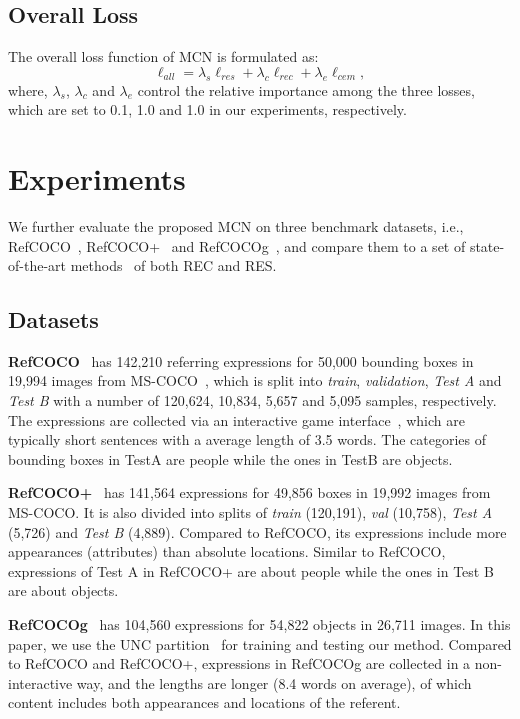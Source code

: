 \documentclass[10pt,twocolumn,letterpaper]{article}
\begin{document}
	
\subsection{Overall Loss}

The overall loss function of MCN is  formulated as:
\begin{equation}
\ell_{all}=\lambda_{s}\ell_{res}+\lambda_{c}\ell_{rec}+\lambda_{e}\ell_{cem},
\end{equation}
where, $\lambda_{s}$, $\lambda_{c}$ and $\lambda_{e}$ control the relative importance among the three losses, which are set to 0.1,  1.0 and 1.0 in our experiments, respectively.

\section{Experiments}
We further evaluate the proposed  MCN
on three benchmark datasets, i.e., RefCOCO~\cite{REFCOCO},
RefCOCO+~\cite{REFCOCO} and RefCOCOg~\cite{REFCOCOG}, and compare them
to a set of state-of-the-art methods~\cite{MATT:,wang2019neighbourhood,yang2019fast,CMSA,RRN} of both REC and RES.

\subsection{Datasets}
\textbf{RefCOCO}~\cite{REFCOCO} has 142,210 referring
expressions for 50,000 bounding boxes in 19,994 images
from MS-COCO~\cite{MSCOCO}, which is split into \emph{train}, \emph{validation},
\emph{Test A} and \emph{Test B} with a number of 120,624, 10,834, 5,657
and 5,095 samples, respectively. The expressions are collected
via an interactive game interface~\cite{REFCOCO}, which are
typically short sentences with a average length of 3.5 words.
The categories of bounding boxes in TestA are people while
the ones in TestB are objects.

\textbf{RefCOCO+}~\cite{REFCOCO} has 141,564 expressions for 49,856
boxes in 19,992 images from MS-COCO. It is also divided
into splits of \emph{train} (120,191), \emph{val} (10,758), \emph{Test A} (5,726)
and \emph{Test B} (4,889). Compared to RefCOCO, its expressions
include more appearances (attributes) than absolute
locations. Similar to RefCOCO, expressions of Test A in RefCOCO+ are about people
while the ones in Test B are about objects.

\textbf{RefCOCOg}~\cite{REFCOCOG,nagaraja2016modeling} has 104,560 expressions for 54,822
objects in 26,711 images. In this paper, we use the UNC partition~\cite{nagaraja2016modeling}  for training and testing our method. 
Compared to RefCOCO and RefCOCO+, expressions in
RefCOCOg are collected in a non-interactive way, and the
lengths are longer (8.4 words on average), of which content
includes both appearances and locations of the referent.
\end{document}
